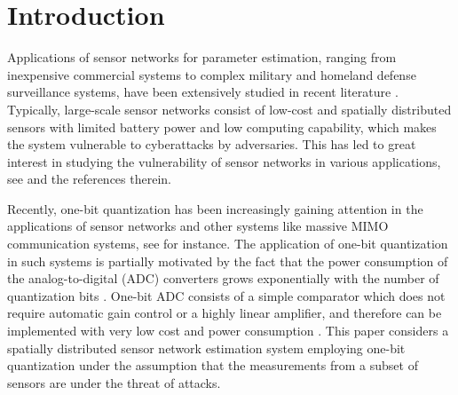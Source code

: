 \documentclass[11pt, draftclsnofoot, onecolumn]{IEEEtran}
\begin{document}
\section{Introduction}
\label{Section_Introduction}

Applications of sensor networks for parameter estimation, ranging from inexpensive commercial systems to complex military and homeland defense surveillance systems, have been extensively studied in recent   literature   \cite{akyildiz2002survey}. Typically, large-scale sensor networks consist of low-cost and spatially distributed sensors with limited battery power and low computing   capability,   which makes the system vulnerable to cyberattacks by adversaries. This has led to great interest in studying the vulnerability of sensor networks in various applications, see \cite{li2005robust, cui2012coordinated, vempaty2013distributed, nadendla2014distributed, zhang2015Asymptotically, alnajjab2015attacks,  zhang2017functional, zhang2017attack} and the references therein.  

Recently, one-bit quantization has been increasingly gaining attention in the applications of sensor networks and other systems like massive MIMO communication systems, see \cite{papadopoulos2001sequential, xiao2006distributed2, ribeiro2006bandwidth1, vempaty2013localization, mollen2017uplink, li2017channel} for instance. The application of one-bit quantization in such systems is partially motivated by the fact that the power consumption of the analog-to-digital (ADC) converters grows exponentially with the number of quantization bits \cite{walden1999analog}. One-bit ADC consists of a simple comparator which does not require automatic gain control or a highly linear amplifier, and therefore can be implemented with very low cost and power consumption \cite{mo2015capacity}.   This paper   considers a spatially distributed sensor network estimation system employing one-bit quantization under the assumption that the measurements from a subset of sensors are under the threat of attacks. 

\end{document}
